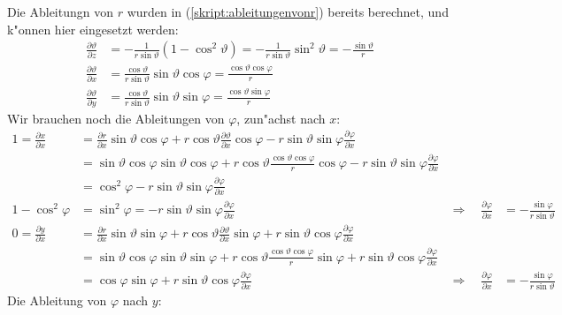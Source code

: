 Die Ableitungn von $r$ wurden in (\ref{skript:ableitungenvonr}) bereits berechnet,
und k"onnen hier eingesetzt werden:
\begin{equation}
\begin{aligned}
\frac{\partial\vartheta}{\partial z}
&=
-\frac{1}{r\sin\vartheta}(1-\cos^2\vartheta)
=
-\frac{1}{r\sin\vartheta}\sin^2\vartheta
=
-\frac{\sin\vartheta}{r}
\\
\frac{\partial \vartheta}{\partial x}
&=
\frac{\cos\vartheta}{r\sin\vartheta}\sin\vartheta\cos\varphi
=
\frac{\cos\vartheta\cos\varphi}{r}
\\
\frac{\partial \vartheta}{\partial y}
&=
\frac{\cos\vartheta}{r\sin\vartheta}\sin\vartheta\sin\varphi
=
\frac{\cos\vartheta\sin\varphi}{r}
\end{aligned}
\label{skript:ableitungenvonvartheta}
\end{equation}
Wir brauchen noch die Ableitungen von $\varphi$, zun"achst nach $x$:
\begin{align*}
1=
\frac{\partial x}{\partial x}
&=
\frac{\partial r}{\partial x}\sin\vartheta\cos\varphi
+
r\cos\vartheta \frac{\partial\vartheta}{\partial x}\cos\varphi
-
r\sin\vartheta\sin\varphi\frac{\partial\varphi}{\partial x}
\\
&=
\sin\vartheta \cos\varphi
\sin\vartheta\cos\varphi
+
r\cos\vartheta
\frac{\cos\vartheta \cos\varphi}{r}
\cos\varphi
-
r\sin\vartheta\sin\varphi
\frac{\partial\varphi}{\partial x}
\\
&=\cos^2\varphi-r\sin\vartheta\sin\varphi\frac{\partial\varphi}{\partial x}
\\
1-\cos^2\varphi
&=
\sin^2\varphi=
-r\sin\vartheta\sin\varphi\frac{\partial\varphi}{\partial x}
&\Rightarrow\quad
\frac{\partial\varphi}{\partial x}
&=-\frac{\sin\varphi}{r\sin\vartheta}
\\
0=
\frac{\partial y}{\partial x}
&=
\frac{\partial r}{\partial x} \sin\vartheta\sin\varphi
+
r\cos\vartheta \frac{\partial\vartheta}{\partial x}\sin\varphi
+
r\sin\vartheta\cos\varphi\frac{\partial\varphi}{\partial x}
\\
&=
\sin\vartheta\cos\varphi
\sin\vartheta\sin\varphi
+
r\cos\vartheta
\frac{\cos\vartheta\cos\varphi}{r}
\sin\varphi
+
r\sin\vartheta\cos\varphi\frac{\partial\varphi}{\partial x}
\\
&=
\cos\varphi\sin\varphi
+
r\sin\vartheta\cos\varphi
\frac{\partial\varphi}{\partial x}
&\Rightarrow\quad
\frac{\partial\varphi}{\partial x}
&=
-\frac{\sin\varphi}{r\sin\vartheta}
\end{align*}
Die Ableitung von $\varphi$ nach $y$:
